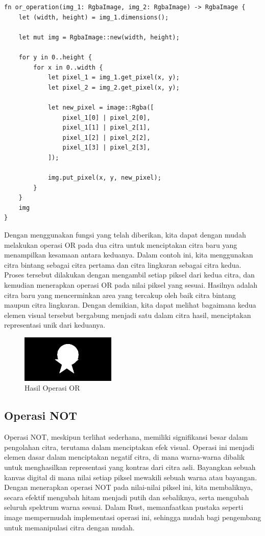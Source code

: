 \documentclass[a4paper,12pt,openany]{book}
\begin{document}
\begin{lstlisting}
fn or_operation(img_1: RgbaImage, img_2: RgbaImage) -> RgbaImage {
    let (width, height) = img_1.dimensions();

    let mut img = RgbaImage::new(width, height);

    for y in 0..height {
        for x in 0..width {
            let pixel_1 = img_1.get_pixel(x, y);
            let pixel_2 = img_2.get_pixel(x, y);

            let new_pixel = image::Rgba([
                pixel_1[0] | pixel_2[0],
                pixel_1[1] | pixel_2[1],
                pixel_1[2] | pixel_2[2],
                pixel_1[3] | pixel_2[3],
            ]);

            img.put_pixel(x, y, new_pixel);
        }
    }
    img
}
\end{lstlisting}


Dengan menggunakan fungsi yang telah diberikan, kita dapat dengan mudah melakukan operasi OR pada dua citra untuk menciptakan citra baru yang menampilkan kesamaan antara keduanya. Dalam contoh ini, kita menggunakan citra bintang sebagai citra pertama dan citra lingkaran sebagai citra kedua. Proses tersebut dilakukan dengan mengambil setiap piksel dari kedua citra, dan kemudian menerapkan operasi OR pada nilai piksel yang sesuai. Hasilnya adalah citra baru yang mencerminkan area yang tercakup oleh baik citra bintang maupun citra lingkaran. Dengan demikian, kita dapat melihat bagaimana kedua elemen visual tersebut bergabung menjadi satu dalam citra hasil, menciptakan representasi unik dari keduanya.

\begin{figure}[H]
    \centering
    \includegraphics[width=0.4\textwidth]{./image/boolean/output-or-operation.png}
    \caption{Hasil Operasi OR}
\end{figure}

\subsection{Operasi NOT}

Operasi NOT, meskipun terlihat sederhana, memiliki signifikansi besar dalam pengolahan citra, terutama dalam menciptakan efek visual. Operasi ini menjadi elemen dasar dalam menciptakan negatif citra, di mana warna-warna dibalik untuk menghasilkan representasi yang kontras dari citra asli. Bayangkan sebuah kanvas digital di mana nilai setiap piksel mewakili sebuah warna atau bayangan. Dengan menerapkan operasi NOT pada nilai-nilai piksel ini, kita membaliknya, secara efektif mengubah hitam menjadi putih dan sebaliknya, serta mengubah seluruh spektrum warna sesuai. Dalam Rust, memanfaatkan pustaka seperti image mempermudah implementasi operasi ini, sehingga mudah bagi pengembang untuk memanipulasi citra dengan mudah.
\end{document}
